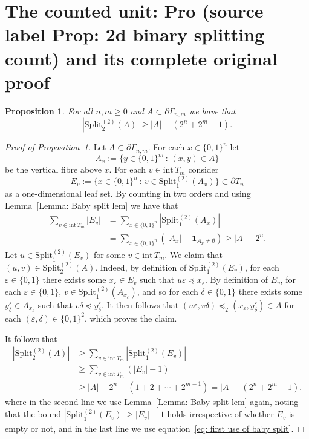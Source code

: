 \documentclass[10pt,a4paper]{amsart}
\newcommand{\Split}{\mathrm{Split}}
\newcommand{\inte}{\mathrm{int}\,}
\newcommand\labs[1]{\left\lvert#1\right\rvert}
\theoremstyle{plain}
\newtheorem{pro}[thm]{Proposition}
\theoremstyle{definition}
\theoremstyle{remark}
\begin{document}
\section{The counted unit: Pro (source label Prop: 2d binary splitting count) and its complete original proof}

\begin{pro}\label{Prop: 2d binary splitting count}
For all $n,m\geq 0$ and $A \subset \partial \Gamma_{n,m}$ we have that
\[ \labs{\Split_2^{(2)}(A)} \geq \labs{A} -(2^n + 2^m -1).\] 
\end{pro}

\begin{proof}[Proof of Proposition~\ref{Prop: 2d binary splitting count}]
Let $A\subset \partial \Gamma_{n,m}$. For each $x \in \{0,1\}^n$ let
\[ A_x:= \{y \in \{0,1\}^m \, : \, (x,y) \in A\}\]
be the vertical fibre above $x$. For each $v \in \inte T_m$ consider
\[ E_v:= \{ x \in \{0,1\}^n \, : \, v \in \Split_1^{(2)}(A_x)\} \subset \partial T_n\]
as a one-dimensional leaf set. By counting in two orders and using Lemma~\ref{Lemma: Baby split lem} we have that
\begin{align} 
\sum_{v\in \inte T_m} \labs{E_v} &= \sum_{x\in \{0,1\}^n} \labs{\Split_1^{(2)}(A_x)} \nonumber \\
&= \sum_{x\in \{0,1\}^n} \left( \labs{A_x} - \mathbf{1}_{A_x \neq \emptyset}\right)\label{eq: first use of baby split}
\geq \labs{A} - 2^n.
\end{align}
Let $u \in \Split_1^{(2)}(E_v)$ for some $v\in \inte T_m$. We claim that $(u,v) \in \Split_2^{(2)}(A)$.
Indeed, by definition of $\Split_1^{(2)}(E_v)$, for each $\varepsilon \in \{0,1\}$ there exists some $x_\varepsilon \in E_v$ such that $u\varepsilon \preceq x_\varepsilon$. By definition of $E_v$, for each $\varepsilon \in \{0,1\}$, $v \in \Split_1^{(2)}(A_{x_\varepsilon})$, and so for each $\delta \in \{0,1\}$ there exists some $y_{\delta}^{\varepsilon} \in A_{x_\varepsilon}$ such that $v\delta \preceq y_{\delta}^{\varepsilon}$. It then follows that $(u\varepsilon,v\delta) \preceq_2 (x_\varepsilon,y_{\delta}^\varepsilon) \in A$ for each $(\varepsilon,\delta )\in \{0,1\}^2$, which proves the claim.

It follows that
\begin{align*}
\labs{\Split_2^{(2)}(A)} &\geq \sum_{v\in  \inte T_m} \labs{\Split_1^{(2)}(E_v)}\\
&\geq\sum_{v\in \inte T_m} \left(\labs{E_v}-1\right)\\
&\geq \labs{A}-2^n - (1+2+\cdots+2^{m-1}) = \labs{A} - (2^n + 2^m-1).
\end{align*}
where in the second line we use Lemma~\ref{Lemma: Baby split lem} again, noting that the bound $\labs{\Split_1^{(2)}(E_v) }\geq \labs{E_v}-1$ holds irrespective of whether $E_v$ is empty or not, and in the last line we use equation~\eqref{eq: first use of baby split}.
\end{proof}
\end{document}
